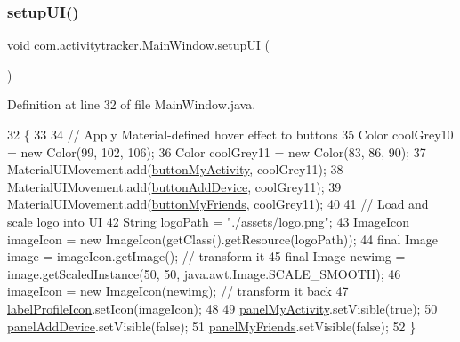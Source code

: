 \subsubsection{\texorpdfstring{setup\+U\+I()}{setupUI()}}
{\footnotesize\ttfamily void com.\+activitytracker.\+Main\+Window.\+setup\+UI (\begin{DoxyParamCaption}{ }\end{DoxyParamCaption})\hspace{0.3cm}{\ttfamily [private]}}



Definition at line 32 of file Main\+Window.\+java.


\begin{DoxyCode}
32                            \{
33 
34         \textcolor{comment}{// Apply Material-defined hover effect to buttons}
35         Color coolGrey10 = \textcolor{keyword}{new} Color(99, 102, 106);
36         Color coolGrey11 = \textcolor{keyword}{new} Color(83, 86, 90);
37         MaterialUIMovement.add(\mbox{\hyperlink{classcom_1_1activitytracker_1_1_main_window_adec15801f8e16f769bd954e351a663fa}{buttonMyActivity}}, coolGrey11);
38         MaterialUIMovement.add(\mbox{\hyperlink{classcom_1_1activitytracker_1_1_main_window_af241d0ee8023ed099caa204419d74ccb}{buttonAddDevice}}, coolGrey11);
39         MaterialUIMovement.add(\mbox{\hyperlink{classcom_1_1activitytracker_1_1_main_window_a4d9543db1723fd7d1921f07cc92e2abb}{buttonMyFriends}}, coolGrey11);
40 
41         \textcolor{comment}{// Load and scale logo into UI}
42         String logoPath = \textcolor{stringliteral}{"./assets/logo.png"};
43         ImageIcon imageIcon = \textcolor{keyword}{new} ImageIcon(getClass().getResource(logoPath));
44         \textcolor{keyword}{final} Image image = imageIcon.getImage(); \textcolor{comment}{// transform it}
45         \textcolor{keyword}{final} Image newimg = image.getScaledInstance(50, 50, java.awt.Image.SCALE\_SMOOTH);
46         imageIcon = \textcolor{keyword}{new} ImageIcon(newimg);  \textcolor{comment}{// transform it back}
47         \mbox{\hyperlink{classcom_1_1activitytracker_1_1_main_window_a05a555ba49d30b00573d07e5acd39e0a}{labelProfileIcon}}.setIcon(imageIcon);
48 
49         \mbox{\hyperlink{classcom_1_1activitytracker_1_1_main_window_a89833c824727a496f4a889177d4d3f3c}{panelMyActivity}}.setVisible(\textcolor{keyword}{true});
50         \mbox{\hyperlink{classcom_1_1activitytracker_1_1_main_window_a02f203d3c00a61d838fcee4657984584}{panelAddDevice}}.setVisible(\textcolor{keyword}{false});
51         \mbox{\hyperlink{classcom_1_1activitytracker_1_1_main_window_afc5efa70337b4b072b38c2cc30991473}{panelMyFriends}}.setVisible(\textcolor{keyword}{false});
52     \}
\end{DoxyCode}


